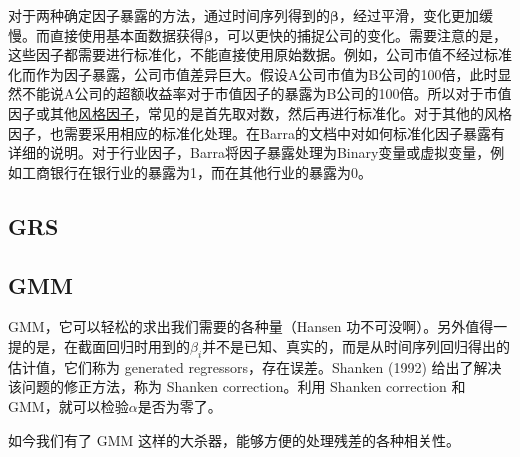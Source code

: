 \documentclass[11pt]{article}
\begin{document}
对于两种确定因子暴露的方法，通过时间序列得到的$\bm{\beta}$，经过平滑，变化更加缓慢。而直接使用基本面数据获得$\bm{\beta}$，可以更快的捕捉公司的变化。需要注意的是，这些因子都需要进行标准化，不能直接使用原始数据。例如，公司市值不经过标准化而作为因子暴露，公司市值差异巨大。假设A公司市值为B公司的100倍，此时显然不能说A公司的超额收益率对于市值因子的暴露为B公司的100倍。所以对于市值因子或其他\uline{风格因子}，常见的是首先取对数，然后再进行标准化。对于其他的风格因子，也需要采用相应的标准化处理。在Barra的文档中对如何标准化因子暴露有详细的说明。对于行业因子，Barra将因子暴露处理为Binary变量或虚拟变量，例如工商银行在银行业的暴露为1，而在其他行业的暴露为0。

\subsection{GRS}

\subsection{GMM}

GMM，它可以轻松的求出我们需要的各种量（Hansen 功不可没啊）。另外值得一提的是，在截面回归时用到的$\beta_i$并不是已知、真实的，而是从时间序列回归得出的估计值，它们称为 generated regressors，存在误差。Shanken (1992) 给出了解决该问题的修正方法，称为 Shanken correction。利用 Shanken correction 和 GMM，就可以检验$\alpha$是否为零了。

如今我们有了 GMM 这样的大杀器，能够方便的处理残差的各种相关性。

\appendix
\end{document}
